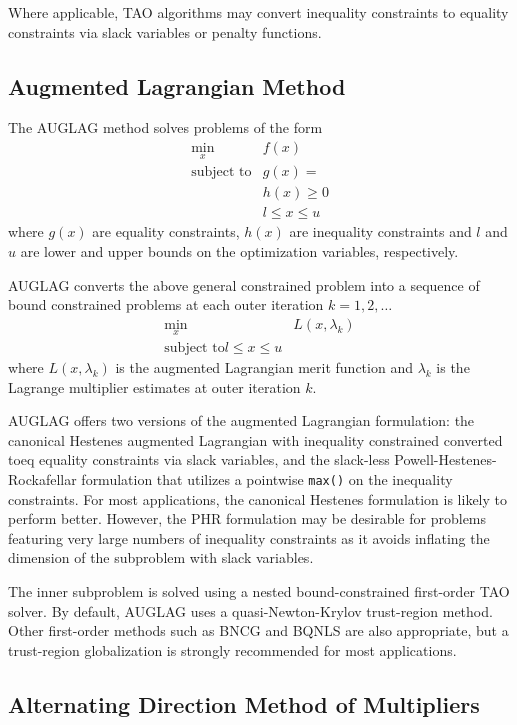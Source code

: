Where applicable, TAO algorithms may convert inequality constraints
to equality constraints via slack variables or penalty functions.

\subsection{Augmented Lagrangian Method}

The AUGLAG method solves problems of the form
\[
\begin{array}{ll}
\displaystyle \min_{x} & f(x) \\
\mbox{subject to} & g(x) =  \\
                  & h(x) \geq 0 \\
                  & l \leq x \leq u
\end{array}
\]
where $g(x)$ are equality constraints, $h(x)$ are inequality constraints
and $l$ and $u$ are lower and upper bounds on the optimization variables,
respectively.

AUGLAG converts the above general constrained problem into a sequence of
bound constrained problems at each outer iteration $k = 1,2,\dots$
\[
\begin{array}{ll}
\displaystyle \min_{x} & L(x, \lambda_k) \\
\mbox{subject to} l \leq x \leq u
\end{array}
\]
where $L(x, \lambda_k)$ is the augmented Lagrangian merit function and $\lambda_k$
is the Lagrange multiplier estimates at outer iteration $k$.

AUGLAG offers two versions of the augmented Lagrangian formulation: the
canonical Hestenes augmented Lagrangian with inequality constrained converted toeq
equality constraints via slack variables, and the slack-less Powell-Hestenes-Rockafellar
formulation that utilizes a pointwise {\tt max()} on the inequality constraints. For
most applications, the canonical Hestenes formulation is likely to perform better.
However, the PHR formulation may be desirable for problems featuring very large numbers
of inequality constraints as it avoids inflating the dimension of the subproblem
with slack variables.

The inner subproblem is solved using a nested bound-constrained first-order TAO solver.
By default, AUGLAG uses a quasi-Newton-Krylov trust-region method. Other first-order
methods such as BNCG and BQNLS are also appropriate, but a trust-region globalization
is strongly recommended for most applications.

\subsection{Alternating Direction Method of Multipliers}

